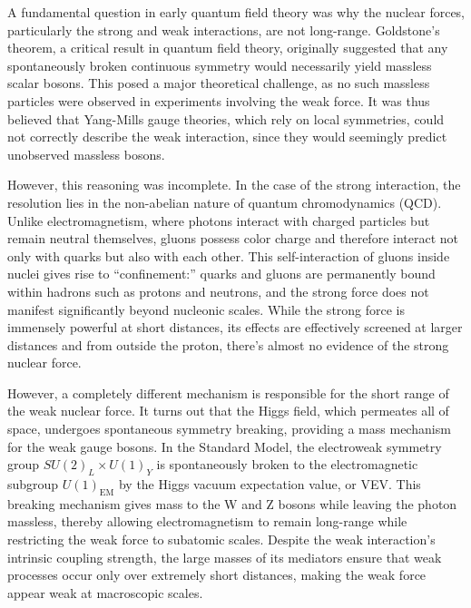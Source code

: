 
A fundamental question in early quantum field theory was why the nuclear forces, particularly the strong and weak interactions, are not long-range. Goldstone’s theorem, a critical result in quantum field theory, originally suggested that any spontaneously broken continuous symmetry would necessarily yield massless scalar bosons. This posed a major theoretical challenge, as no such massless particles were observed in experiments involving the weak force. It was thus believed that Yang-Mills gauge theories, which rely on local symmetries, could not correctly describe the weak interaction, since they would seemingly predict unobserved massless bosons.

However, this reasoning was incomplete. In the case of the strong interaction, the resolution lies in the non-abelian nature of quantum chromodynamics (QCD). Unlike electromagnetism, where photons interact with charged particles but remain neutral themselves, gluons possess color charge and therefore interact not only with quarks but also with each other. This self-interaction of gluons inside nuclei gives rise to ``confinement:'' quarks and gluons are permanently bound within hadrons such as protons and neutrons, and the strong force does not manifest significantly beyond nucleonic scales. While the strong force is immensely powerful at short distances, its effects are effectively screened at larger distances and from outside the proton, there’s almost no evidence of the strong nuclear force.

However, a completely different mechanism is responsible for the short range of the weak nuclear force. It turns out that the Higgs field, which permeates all of space, undergoes spontaneous symmetry breaking, providing a mass mechanism for the weak gauge bosons. In the Standard Model, the electroweak symmetry group $SU(2)_L \times U(1)_Y$ is spontaneously broken to the electromagnetic subgroup $U(1)_{\text{EM}}$ by the Higgs vacuum expectation value, or VEV. This breaking mechanism gives mass to the W and Z bosons while leaving the photon massless, thereby allowing electromagnetism to remain long-range while restricting the weak force to subatomic scales. Despite the weak interaction's intrinsic coupling strength, the large masses of its mediators ensure that weak processes occur only over extremely short distances, making the weak force appear weak at macroscopic scales.

